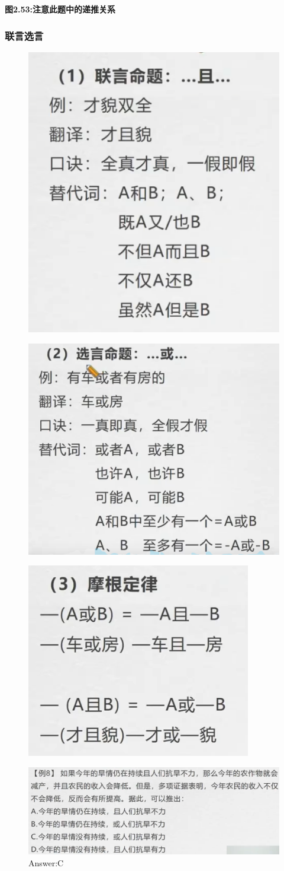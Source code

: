 \documentclass{article}
\numberwithin{equation}{section}						%
\numberwithin{figure}{section}							%
\begin{document}
\begin{sloppypar}
\textbf{图2.53:注意此题中的递推关系}


\subsubsection{联言选言}

\begin{figure}[H]
     \centering
     \includegraphics[width=0.35\linewidth]{158.png}
\end{figure}


\begin{figure}[H]
     \centering
     \includegraphics[width=0.35\linewidth]{159.png}
\end{figure}


\begin{figure}[H]
     \centering
     \includegraphics[width=0.35\linewidth]{160.png}
\end{figure}

\begin{figure}[H]
     \centering
     \includegraphics[width=0.6\linewidth]{161.png}
	\caption{Answer:C}
\end{figure}



\end{sloppypar}
\end{document}
